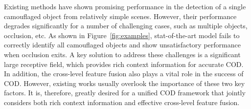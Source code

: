 \documentclass{article}
\begin{document}
Existing methods have shown promising performance in the detection of a single camouflaged object from relatively simple scenes. However, their performance degrades significantly for a number of challenging cases, such as multiple objects, occlusion, etc.
As shown in Figure~\ref{fig:examples}, stat-of-the-art model fails to correctly identify all camouflaged objects and show unsatisfactory performance when occlusion exits.
A key solution to address these challenges is a significant large receptive field, which provides rich context information for accurate COD.
In addition, the cross-level feature fusion also plays a vital role in the success of COD.
However, existing works usually overlook the importance of these two key factors. It is, therefore, greatly desired for a unified COD framework that jointly considers both rich context information and effective cross-level feature fusion.
\end{document}
